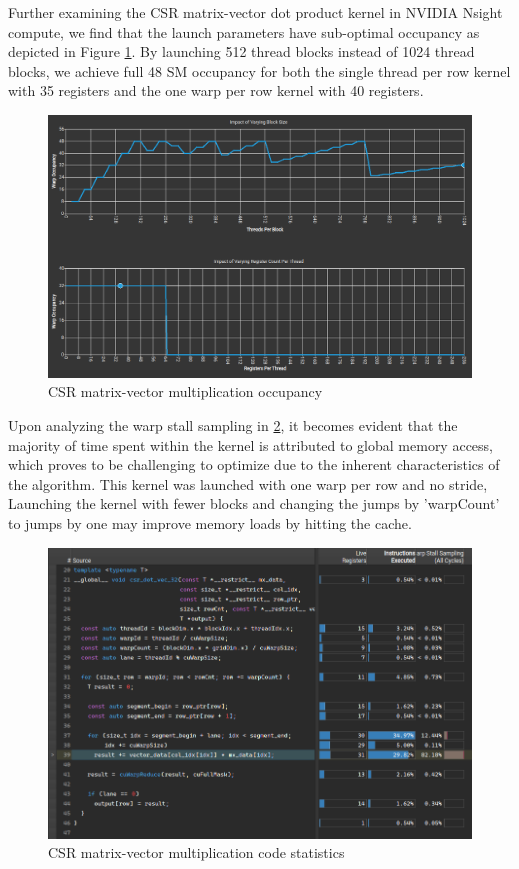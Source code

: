 \documentclass{article}
\begin{document}
Further examining the CSR matrix-vector dot product kernel in NVIDIA Nsight compute,
we find that the launch parameters have sub-optimal occupancy as depicted in Figure \ref{img:nsys_occupancy}.
By launching 512 thread blocks instead of 1024 thread blocks, we achieve full 48 SM occupancy for both
the single thread per row kernel with 35 registers and the one warp per row kernel with 40 registers.

\begin{figure}[H]
\includegraphics[scale=0.7]{images/csr_warp_occupancy.png}
\caption{CSR matrix-vector multiplication occupancy}
\label{img:nsys_occupancy}
\end{figure}

Upon analyzing the warp stall sampling in \ref{img:csr_stalling},
it becomes evident that the majority of time spent within the kernel is attributed to global memory access,
which proves to be challenging to optimize due to the inherent characteristics of the algorithm.
This kernel was launched with one warp per row and no stride,
Launching the kernel with fewer blocks and changing the jumps by 'warpCount'
to jumps by one may improve memory loads by hitting the cache.

\begin{figure}[H]
\includegraphics[scale=0.9]{images/csr_stalling.png}
\caption{CSR matrix-vector multiplication code statistics}
\label{img:csr_stalling}
\end{figure}
\end{document}
